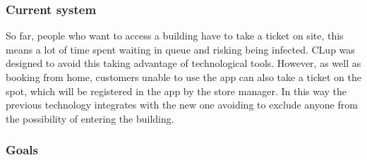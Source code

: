 \documentclass{article}
\begin{document}
         \subsubsection {Current system}
         So far, people who want to access a building have to take a ticket on site, this means a lot of time spent waiting in queue and risking being infected. CLup was designed to avoid this taking advantage of technological tools.
However, as well as booking from home, customers unable to use the app can also take a ticket on the spot, which will be registered in the app by the store manager. In this way the previous technology integrates with the new one avoiding to exclude anyone from the possibility of entering the building.
         
         \subsubsection{Goals}
         \renewcommand{\theenumi}{[G\,\arabic{enumi}]}
\end{document}
